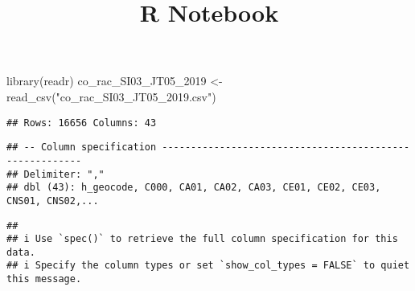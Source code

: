 \documentclass[
]{article}
\title{R Notebook}
\author{}
\date{\vspace{-2.5em}}
\newenvironment{Shaded}{\begin{snugshade}}{\end{snugshade}}
\newcommand{\DocumentationTok}[1]{\textcolor[rgb]{0.56,0.35,0.01}{\textbf{\textit{#1}}}}
\newcommand{\FunctionTok}[1]{\textcolor[rgb]{0.00,0.00,0.00}{#1}}
\newcommand{\NormalTok}[1]{#1}
\newcommand{\OtherTok}[1]{\textcolor[rgb]{0.56,0.35,0.01}{#1}}
\newcommand{\SpecialCharTok}[1]{\textcolor[rgb]{0.00,0.00,0.00}{#1}}
\newcommand{\StringTok}[1]{\textcolor[rgb]{0.31,0.60,0.02}{#1}}
\begin{document}
\maketitle

\begin{Shaded}
\begin{Highlighting}[]
\FunctionTok{library}\NormalTok{(readr)}
\NormalTok{co\_rac\_SI03\_JT05\_2019 }\OtherTok{\textless{}{-}} \FunctionTok{read\_csv}\NormalTok{(}\StringTok{"co\_rac\_SI03\_JT05\_2019.csv"}\NormalTok{)}
\end{Highlighting}
\end{Shaded}

\begin{verbatim}
## Rows: 16656 Columns: 43
\end{verbatim}

\begin{verbatim}
## -- Column specification --------------------------------------------------------
## Delimiter: ","
## dbl (43): h_geocode, C000, CA01, CA02, CA03, CE01, CE02, CE03, CNS01, CNS02,...
\end{verbatim}

\begin{verbatim}
## 
## i Use `spec()` to retrieve the full column specification for this data.
## i Specify the column types or set `show_col_types = FALSE` to quiet this message.
\end{verbatim}

\begin{Shaded}
\end{Shaded}
\end{document}
